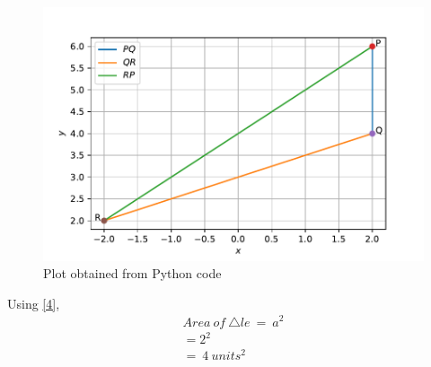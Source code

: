 \documentclass[journal,12pt,twocolumn]{IEEEtran}
\renewcommand\thesection{\arabic{section}}
\begin{document}
\begin{enumerate}[label=\thesection.\arabic*.,ref=\thesection.\theenumi]
\begin{figure}[h]
	\centering
	\includegraphics[width=\columnwidth]{Figure_1.pdf}
	\caption{Plot obtained from Python code}
	\label{Fig:3.1}
\end{figure}


Using \eqref{4},
\begin{align}
Area\:of\:\triangle le\:=\:a^2\\=2^2\\=\:4\:units^2
\end{align}




\end{enumerate}
\end{document}
